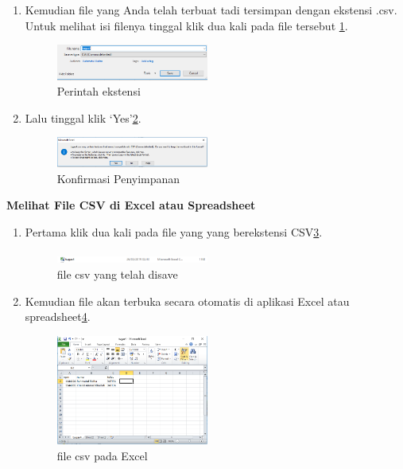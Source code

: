 \begin{enumerate}
\begin{enumerate}
\item Kemudian file yang Anda telah terbuat tadi tersimpan dengan ekstensi .csv. Untuk melihat isi filenya tinggal klik dua kali pada file tersebut \ref{ekstensi}.

		\begin{figure}[H]	\includegraphics[width=5cm]{figures/4/1144124/Chapter4/3.png}
			\centering
        \caption{Perintah ekstensi}
        \label{ekstensi}
		\end{figure}
		
	   \item Lalu tinggal klik `Yes'\ref{lokasipenyimpanan}.
	
		\begin{figure}[H] \includegraphics[width=5cm]{figures/4/1144124/Chapter4/4.png}
		\centering
		\caption{Konfirmasi Penyimpanan}
        \label{lokasipenyimpanan}
        \end{figure}
        \end{enumerate}

   \textbf{Melihat File CSV di Excel atau Spreadsheet}

	 \begin{enumerate}
		\item Pertama klik dua kali pada file yang yang berekstensi CSV\ref{filecsv}.
		
		\begin{figure}[H]	\includegraphics[width=5cm]{figures/4/1144124/Chapter4/5.png}
		\centering
		\caption{file csv yang telah disave}
        \label{filecsv}
        \end{figure}
		
		\item Kemudian file akan terbuka secara otomatis di aplikasi Excel atau spreadsheet\ref{filecsv1}.
		
		\begin{figure}[H] \includegraphics[width=5cm]{figures/4/1144124/Chapter4/6.png}
		\centering
        \caption{file csv pada Excel}
        \label{filecsv1}
		\end{figure}
	 \end{enumerate}


\end{enumerate}
